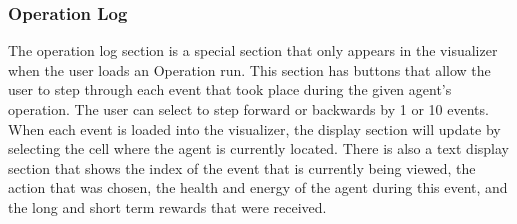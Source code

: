 \subsubsection{Operation Log}
The operation log section is a special section that only appears in the visualizer when the user loads an Operation run.
This section has buttons that allow the user to step through each event that took place during the given agent's operation.
The user can select to step forward or backwards by 1 or 10 events.
When each event is loaded into the visualizer, the display section will update by selecting the cell where the agent is currently located.
There is also a text display section that shows the index of the event that is currently being viewed, the action that was chosen, the health and energy of the agent during this event, and the long and short term rewards that were received.
